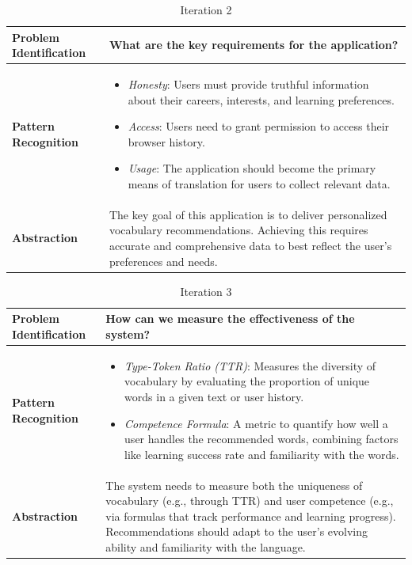 \documentclass{article}
\begin{document}
\begin{table}[H]
\centering
\begin{tabular}{|p{}|p{}|}
\hline
\textbf{Problem Identification} 
&
What are the key requirements for the application?\\
\hline
\textbf{Pattern Recognition}
&
\begin{itemize}
\item \textit{Honesty}: Users must provide truthful information about their careers, interests, and learning preferences.
\item \textit{Access}: Users need to grant permission to access their browser history.
\item \textit{Usage}: The application should become the primary means of translation for users to collect relevant data.
\end{itemize}
\\
\hline
\textbf{Abstraction}
&
The key goal of this application is to deliver personalized vocabulary recommendations. Achieving this requires accurate and comprehensive data to best reflect the user's preferences and needs.
\\
\hline
\end{tabular}
\caption{Iteration 2}
\label{table:ct-thinking-iter2}
\end{table}

\begin{table}[H]
\centering
\begin{tabular}{|p{}|p{}|}
\hline
\textbf{Problem Identification} 
&
How can we measure the effectiveness of the system?\\
\hline
\textbf{Pattern Recognition}
&
\begin{itemize}
\item \textit{Type-Token Ratio (TTR)}: Measures the diversity of vocabulary by evaluating the proportion of unique words in a given text or user history.
\item \textit{Competence Formula}: A metric to quantify how well a user handles the recommended words, combining factors like learning success rate and familiarity with the words.
\end{itemize}
\\
\hline
\textbf{Abstraction}
&
The system needs to measure both the uniqueness of vocabulary (e.g., through TTR) and user competence (e.g., via formulas that track performance and learning progress). Recommendations should adapt to the user's evolving ability and familiarity with the language.
\\
\hline
\end{tabular}
\caption{Iteration 3}
\label{table:ct-thinking-iter3}
\end{table}
\end{document}
